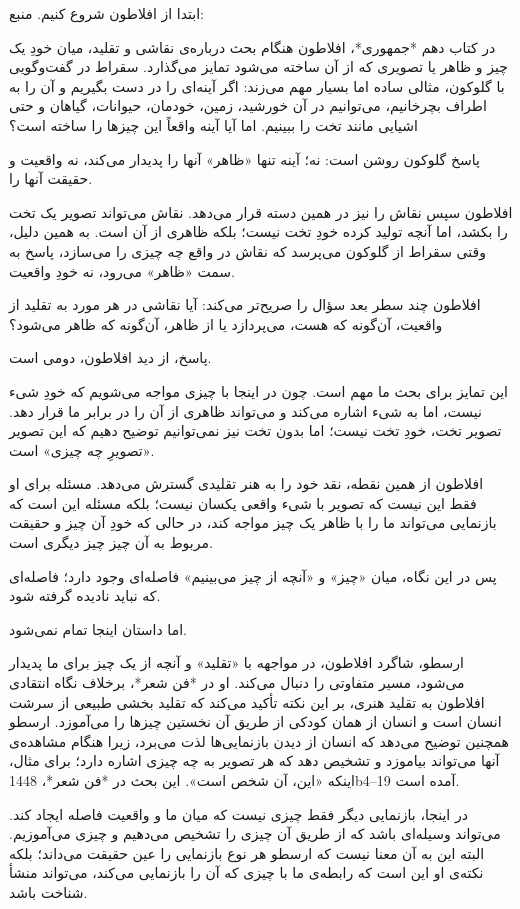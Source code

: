 ابتدا از افلاطون شروع کنیم.
منبع:

در کتاب دهم *جمهوری*، افلاطون هنگام بحث درباره‌ی نقاشی و تقلید، میان خودِ یک چیز و ظاهر یا تصویری که از آن ساخته می‌شود تمایز می‌گذارد. سقراط در گفت‌وگویی با گلوکون، مثالی ساده اما بسیار مهم می‌زند: اگر آینه‌ای را در دست بگیریم و آن را به اطراف بچرخانیم، می‌توانیم در آن خورشید، زمین، خودمان، حیوانات، گیاهان و حتی اشیایی مانند تخت را ببینیم. اما آیا آینه واقعاً این چیزها را ساخته است؟

پاسخ گلوکون روشن است: نه؛ آینه تنها «ظاهر» آنها را پدیدار می‌کند، نه واقعیت و حقیقت آنها را.

افلاطون سپس نقاش را نیز در همین دسته قرار می‌دهد. نقاش می‌تواند تصویر یک تخت را بکشد، اما آنچه تولید کرده خودِ تخت نیست؛ بلکه ظاهری از آن است. به همین دلیل، وقتی سقراط از گلوکون می‌پرسد که نقاش در واقع چه چیزی را می‌سازد، پاسخ به سمت «ظاهر» می‌رود، نه خودِ واقعیت.

افلاطون چند سطر بعد سؤال را صریح‌تر می‌کند: آیا نقاشی در هر مورد به تقلید از واقعیت، آن‌گونه که هست، می‌پردازد یا از ظاهر، آن‌گونه که ظاهر می‌شود؟

پاسخ، از دید افلاطون، دومی است.

این تمایز برای بحث ما مهم است. چون در اینجا با چیزی مواجه می‌شویم که خودِ شیء نیست، اما به شیء اشاره می‌کند و می‌تواند ظاهری از آن را در برابر ما قرار دهد. تصویر تخت، خودِ تخت نیست؛ اما بدون تخت نیز نمی‌توانیم توضیح دهیم که این تصویر «تصویرِ چه چیزی» است.

افلاطون از همین نقطه، نقد خود را به هنر تقلیدی گسترش می‌دهد. مسئله برای او فقط این نیست که تصویر با شیء واقعی یکسان نیست؛ بلکه مسئله این است که بازنمایی می‌تواند ما را با ظاهر یک چیز مواجه کند، در حالی که خودِ آن چیز و حقیقت مربوط به آن چیز چیز دیگری است.

پس در این نگاه، میان «چیز» و «آنچه از چیز می‌بینیم» فاصله‌ای وجود دارد؛ فاصله‌ای که نباید نادیده گرفته شود.

اما داستان اینجا تمام نمی‌شود.

ارسطو، شاگرد افلاطون، در مواجهه با «تقلید» و آنچه از یک چیز برای ما پدیدار می‌شود، مسیر متفاوتی را دنبال می‌کند. او در *فن شعر*، برخلاف نگاه انتقادی افلاطون به تقلید هنری، بر این نکته تأکید می‌کند که تقلید بخشی طبیعی از سرشت انسان است و انسان از همان کودکی از طریق آن نخستین چیزها را می‌آموزد. ارسطو همچنین توضیح می‌دهد که انسان از دیدن بازنمایی‌ها لذت می‌برد، زیرا هنگام مشاهده‌ی آنها می‌تواند بیاموزد و تشخیص دهد که هر تصویر به چه چیزی اشاره دارد؛ برای مثال، اینکه «این، آن شخص است». این بحث در *فن شعر*، 1448b4–19 آمده است.

در اینجا، بازنمایی دیگر فقط چیزی نیست که میان ما و واقعیت فاصله ایجاد کند. می‌تواند وسیله‌ای باشد که از طریق آن چیزی را تشخیص می‌دهیم و چیزی می‌آموزیم. البته این به آن معنا نیست که ارسطو هر نوع بازنمایی را عین حقیقت می‌داند؛ بلکه نکته‌ی او این است که رابطه‌ی ما با چیزی که آن را بازنمایی می‌کند، می‌تواند منشأ شناخت باشد.

